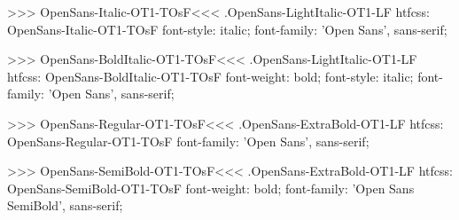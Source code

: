 >>>
\<OpenSans-Italic-OT1-TOsF\><<<
.OpenSans-LightItalic-OT1-LF
htfcss:  OpenSans-Italic-OT1-TOsF  font-style: italic; font-family: 'Open Sans', sans-serif;

>>>
\<OpenSans-BoldItalic-OT1-TOsF\><<<
.OpenSans-LightItalic-OT1-LF
htfcss:  OpenSans-BoldItalic-OT1-TOsF  font-weight: bold; font-style: italic; font-family: 'Open Sans', sans-serif;

>>>
\<OpenSans-Regular-OT1-TOsF\><<<
.OpenSans-ExtraBold-OT1-LF
htfcss:  OpenSans-Regular-OT1-TOsF  font-family: 'Open Sans', sans-serif;

>>>
\<OpenSans-SemiBold-OT1-TOsF\><<<
.OpenSans-ExtraBold-OT1-LF
htfcss:  OpenSans-SemiBold-OT1-TOsF  font-weight: bold; font-family: 'Open Sans SemiBold', sans-serif;

